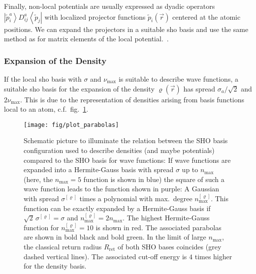 \documentclass[oribibl]{llncs}
\newcommand{\um}[1]{_{\mathrm{#1}}}
\newcommand{\ket}[1]{\left| #1 \right\rangle}
\newcommand{\bra}[1]{\left\langle #1 \right|}
\begin{document}
Finally, non-local potentials are usually expressed as dyadic operators
$\ket{\tilde p^a_i} D^a_{ij} \bra{\tilde p_j}$ with localized projector functions $\tilde p_i(\vec r)$
centered at the atomic positions.
We can expand the projectors in a suitable \ac{sho} basis and use the same method
as for matrix elements of the local potential.~\cite{BaumeisterTsukamotoPASC19}.

\subsubsection{Expansion of the Density}
If the local \ac{sho} basis with $\sigma$ and $\nu\um{max}$
is suitable to describe wave functions, 
a suitable \ac{sho} basis for the expansion of the density $\varrho(\vec r)$ has
spread $\sigma_a/\sqrt{2}$ and $2\nu\um{max}$.
This is due to the representation of densities
arising from basis functions local to an atom, c.f.~fig.~\ref{fig:plot_parabolas}.
%
\begin{figure}
  \begin{minipage}[c]{.990\textwidth}
	\texttt{[image: fig/plot\_parabolas]} %
  \end{minipage}\hfill
  \begin{minipage}[c]{.009\textwidth}
  \end{minipage}
  \label{fig:plot_parabolas}
  \caption{
Schematic picture to illuminate the relation between the SHO basis configuration 
used to describe densities (and maybe potentials)
compared to the SHO basis for wave functions:
If wave functions are expanded into a Hermite-Gauss basis with spread $\sigma$
up to $n\um{max}$ (here, the $n\um{max} = 5$ function is shown in blue)
the square of such a wave function leads to the function shown in purple:
A Gaussian with spread $\sigma^{[\varrho]}$ times a polynomial with max.~degree $n\um{max}^{[\varrho]}$.
This function can be exactly expanded by a Hermite-Gauss basis if
$\sqrt{2}\,\sigma^{[\varrho]} = \sigma$
and
$n\um{max}^{[\varrho]} = 2n\um{max}$.
The highest Hermite-Gauss function for $n\um{max}^{[\varrho]} = 10$ is shown in red.
The associated parabolas are shown in bold black and bold green.
In the limit of large $n\um{max}$, the classical return radius $R\um{ret}$
of both SHO bases coincides (grey dashed vertical lines).
The associated cut-off energy is $4$ times higher for the density basis.
  }
\end{figure}
%
%
\end{document}
